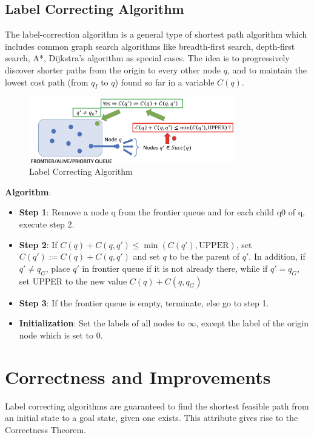 \documentclass[twoside]{article}
\begin{document}
\subsection{Label Correcting Algorithm}
The label-correction algorithm is a general type of shortest path algorithm which includes common graph search algorithms like breadth-first search, depth-first search, A*, Dijkstra’s algorithm as special cases.
The idea is to progressively discover shorter paths from the origin to every other node $q$, and to maintain the lowest cost path (from $q_I$ to $q$) found so far in a variable $C(q)$.
\vspace{3em}
\begin{figure}[h]
\begin{center}
\includegraphics[width=0.8\textwidth]{fig15_10.PNG}
\caption{Label Correcting Algorithm}
\end{center}
\end{figure}
\newpage
\textbf{Algorithm}:
\vspace{-0.7em}
\begin{itemize}
    \item \textbf{Step 1}: Remove a node q from the frontier queue and for each child q0 of q, execute step 2.
    \item \textbf{Step 2}: If $ C(q) + C(q, q') \leq \min(C(q'),\textrm{UPPER})$, set $ C(q') := C(q) + C(q, q')$ and set $q$ to be the parent of $q'$. In addition, if $q' \neq q_G$, place $q'$ in frontier queue if it is not already there, while if $q' = q_G$, set UPPER to the new value $C(q) + C(q, q_G)$
    \item \textbf{Step 3}: If the frontier queue is empty, terminate, else go to step 1.
    \item \textbf{Initialization}: Set the labels of all nodes to $\infty$, except the label of the origin node which is set to 0.
\end{itemize}
\vspace{-1em}

\section{Correctness and Improvements}
Label correcting algorithms are guaranteed to find the shortest feasible path from an initial state to a goal state, given one exists. This attribute gives rise to the Correctness Theorem. \vspace{-0.5cm}
\end{document}
